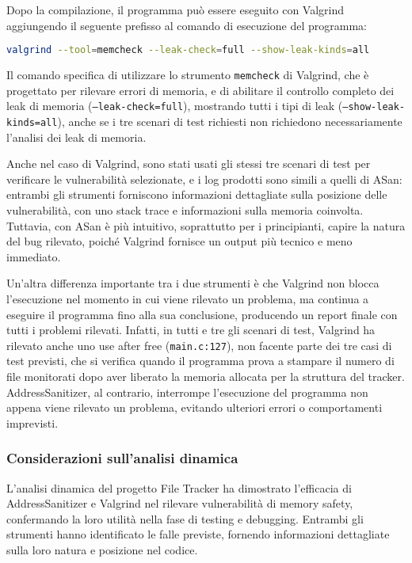 Dopo la compilazione, il programma può essere eseguito con Valgrind aggiungendo
il seguente prefisso al comando di esecuzione del programma: \begin{lstlisting}[language=bash, numbers=none]
valgrind --tool=memcheck --leak-check=full --show-leak-kinds=all
\end{lstlisting}

Il comando specifica di utilizzare lo strumento \texttt{memcheck} di Valgrind,
che è progettato per rilevare errori di memoria, e di abilitare il controllo completo
dei leak di memoria (\texttt{--leak-check=full}), mostrando tutti i tipi di leak
(\texttt{--show-leak-kinds=all}), anche se i tre scenari di test richiesti non richiedono
necessariamente l'analisi dei leak di memoria.

Anche nel caso di Valgrind, sono stati usati gli stessi tre scenari di test per
verificare le vulnerabilità selezionate, e i log prodotti sono simili a quelli di
ASan: entrambi gli strumenti forniscono informazioni dettagliate sulla posizione
delle vulnerabilità, con uno stack trace e informazioni sulla memoria coinvolta.
Tuttavia, con ASan è più intuitivo, soprattutto per i principianti, capire la natura
del bug rilevato, poiché Valgrind fornisce un output più tecnico e meno
immediato.

Un'altra differenza importante tra i due strumenti è che Valgrind non blocca l'esecuzione
nel momento in cui viene rilevato un problema, ma continua a eseguire il programma
fino alla sua conclusione, producendo un report finale con tutti i problemi
rilevati. Infatti, in tutti e tre gli scenari di test, Valgrind ha rilevato anche
uno use after free (\texttt{main.c:127}), non facente parte dei tre casi di test
previsti, che si verifica quando il programma prova a stampare il numero di file
monitorati dopo aver liberato la memoria allocata per la struttura del tracker. AddressSanitizer,
al contrario, interrompe l'esecuzione del programma non appena viene rilevato un
problema, evitando ulteriori errori o comportamenti imprevisti.

\subsubsection*{Considerazioni sull'analisi dinamica}
L'analisi dinamica del progetto File Tracker ha dimostrato l'efficacia di
AddressSanitizer e Valgrind nel rilevare vulnerabilità di memory safety, confermando
la loro utilità nella fase di testing e debugging. Entrambi gli strumenti hanno
identificato le falle previste, fornendo informazioni dettagliate sulla loro natura
e posizione nel codice.

